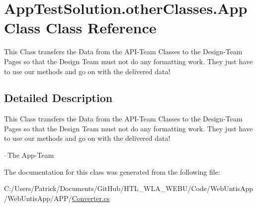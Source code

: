 \hypertarget{class_app_test_solution_1_1other_classes_1_1_app_class}{\section{App\-Test\-Solution.\-other\-Classes.\-App\-Class Class Reference}
\label{class_app_test_solution_1_1other_classes_1_1_app_class}
}


This Class transfers the Data from the A\-P\-I-\/\-Team Classes to the Design-\/\-Team Pages so that the Design Team must not do any formatting work. They just have to use our methods and go on with the delivered data!  




\subsection{Detailed Description}
This Class transfers the Data from the A\-P\-I-\/\-Team Classes to the Design-\/\-Team Pages so that the Design Team must not do any formatting work. They just have to use our methods and go on with the delivered data! 

--The App-\/\-Team 

The documentation for this class was generated from the following file\-:\begin{DoxyCompactItemize}
\item 
C\-:/\-Users/\-Patrick/\-Documents/\-Git\-Hub/\-H\-T\-L\-\_\-\-W\-L\-A\-\_\-\-W\-E\-B\-U/\-Code/\-Web\-Untis\-App/\-Web\-Untis\-App/\-A\-P\-P/\hyperlink{_converter_8cs}{Converter.\-cs}\end{DoxyCompactItemize}

